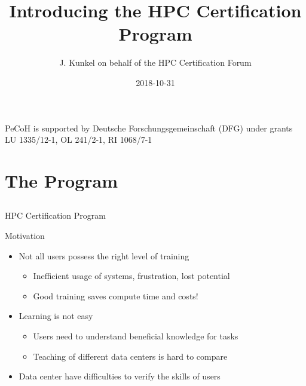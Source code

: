 \documentclass[compress,aspectratio=169]{beamer}
\subtitle{}
\title{\huge Introducing the HPC Certification Program}
\author{J. Kunkel on behalf of the HPC Certification Forum}
\date{2018-10-31}
\institute{Computer Science Department}
\begin{document}
\begin{frame}[plain]{}
	\maketitle
	{\fontsize{5.85pt}{6pt}\selectfont PeCoH is supported by Deutsche Forschungsgemeinschaft (DFG) under grants LU 1335/12-1, OL 241/2-1, RI 1068/7-1}
\end{frame}






\section{The Program}
\sectionIntroHidden

\subsection{}

\begin{frame}{HPC Certification Program}
	\begin{block}{Motivation}
		\begin{itemize}

			\item Not all users possess the right level of training
				\begin{itemize}
				\item Inefficient usage of systems, frustration, lost potential
				\item Good training saves compute time and costs!
				\end{itemize}
			\item Learning is not easy
			\begin{itemize}
				\item Users need to understand beneficial knowledge for tasks
				\item Teaching of different data centers is hard to compare
			\end{itemize}
			\item Data center have difficulties to verify the skills of users
		\end{itemize}
	\end{block}

\end{frame}
\end{document}

